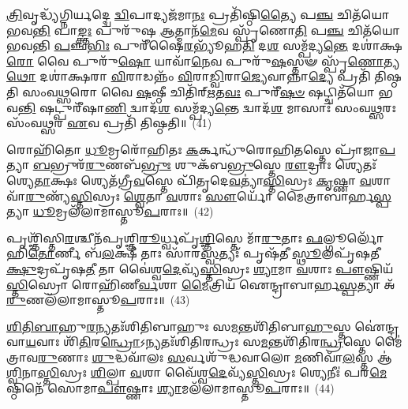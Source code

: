 \-\ul{𑌤𑍍𑌰𑌿}\-𑌵𑍃𑌦𑍍𑌧𑍍𑌯᳴𑌗𑍍𑌨𑌿𑌰𑍍𑌯𑌦𑍍𑌦𑍍𑌵𑍇 \ul{𑌦𑍍𑌵𑌿}\-𑌪𑌾𑌦𑍍𑌯𑌜᳴𑌮𑌾\-\ul{𑌨𑌃} 𑌪𑍍𑌰𑌤𑌿᳴𑌷𑍍𑌠𑌿\-\ul{𑌤𑍍𑌯𑍈} 𑌪\-\ul{𑌞𑍍𑌚} 𑌚𑌿𑌤᳴𑌯𑍋 𑌭𑌵\-\ul{𑌨𑍍𑌤𑌿} 𑌪𑌾\-\ul{𑌙𑍍𑌕𑍍𑌤𑌃} 𑌪𑍁𑌰𑍁᳴𑌷 \ul{𑌆}\-𑌤𑍍𑌮𑌾𑌨᳴\-\ul{𑌮𑍇}\-𑌵 𑌸𑍍𑌪𑍃᳴𑌣𑍋\-\ul{𑌤𑌿} 𑌪\-\ul{𑌞𑍍𑌚} 𑌚𑌿𑌤᳴𑌯𑍋 𑌭𑌵𑌨𑍍𑌤𑌿 \ul{𑌪}\-𑌞𑍍𑌚\-\ul{𑌭𑌿𑌃} 𑌪𑍁𑌰𑍀᳴𑌷𑍈\-\ul{𑌰}\-𑌭𑍍𑌯𑍂᳴𑌹\-\ul{𑌤𑌿} 𑌦\-\ul{𑌶} 𑌸𑌮𑍍𑌪᳴𑌦𑍍𑌯\-\ul{𑌨𑍍𑌤𑍇} 𑌦𑌶𑌾॑𑌕𑍍𑌷\-\ul{𑌰𑍋} 𑌵𑍈 𑌪𑍁𑌰𑍁᳴\-\ul{𑌷𑍋} 𑌯𑌾𑌵𑌾᳴\-\ul{𑌨𑍇}\-𑌵 𑌪𑍁𑌰𑍁᳴\-\ul{𑌷}\-𑌸𑍍𑌤𑍟 𑌸𑍍𑌪𑍃᳴\-\ul{𑌣𑍋}\-𑌤𑍍𑌯\-\ul{𑌥𑍋} 𑌦𑌶𑌾॑𑌕𑍍𑌷𑌰𑌾 \ul{𑌵𑌿}\-𑌰𑌾𑌡𑌨𑍍𑌨𑌂᳴ \ul{𑌵𑌿}\-𑌰𑌾\-\ul{𑌡𑍍𑌵𑌿}\-𑌰𑌾\-\ul{𑌜𑍍𑌯𑍇}\-𑌵𑌾𑌨𑍍𑌨𑌾\-\ul{𑌦𑍍𑌯𑍇} 𑌪𑍍𑌰𑌤𑌿᳴ 𑌤𑌿𑌷𑍍𑌠𑌤𑌿 𑌸𑌂𑌵\-\ul{𑌥𑍍𑌸}\-𑌰𑍋 𑌵𑍈 \ul{𑌷}\-𑌷𑍍𑌠𑍀 𑌚𑌿𑌤𑌿᳴𑌰𑍍\mbox{}\-\ul{𑌋}\-𑌤\-\ul{𑌵𑌃} 𑌪𑍁𑌰𑍀᳴\-\ul{𑌷}\-\-\ul{𑍞} 𑌷𑌟𑍍𑌚𑌿𑌤᳴𑌯𑍋 𑌭𑌵\-\ul{𑌨𑍍𑌤𑌿} 𑌷𑌟𑍍𑌪𑍁𑌰𑍀᳴𑌷𑌾\-\ul{𑌣𑌿} 𑌦𑍍𑌵𑌾𑌦᳴\-\ul{𑌶} 𑌸𑌮𑍍𑌪᳴𑌦𑍍𑌯\-\ul{𑌨𑍍𑌤𑍇} 𑌦𑍍𑌵𑌾𑌦᳴\-\ul{𑌶} 𑌮𑌾𑌸𑌾𑌃॑ 𑌸𑌂𑌵\-\ul{𑌥𑍍𑌸}\-𑌰𑌃 𑌸𑌂᳴𑌵\-\ul{𑌥𑍍𑌸}\-𑌰 \ul{𑌏}\-𑌵 𑌪𑍍𑌰𑌤𑌿᳴ 𑌤𑌿𑌷𑍍𑌠𑌤𑌿॥~(41)

{\anuvakamend[{𑌅\-\ul{𑌵} 𑌚𑌿𑌤᳴\-\ul{𑌯𑌃} 𑌪𑍁𑌰𑍀᳴\-\ul{𑌷𑌂} 𑌪𑌞𑍍𑌚᳴𑌦𑌶 𑌚}]}%

𑌰𑍋𑌹𑌿᳴𑌤𑍋 \ul{𑌧𑍂}\-𑌮𑍍𑌰𑌰𑍋᳴𑌹𑌿𑌤𑌃 \ul{𑌕}\-𑌰𑍍𑌕𑌨𑍍𑌧𑍁᳴𑌰𑍋𑌹𑌿\-\ul{𑌤}\-𑌸𑍍𑌤𑍇 𑌪𑍍𑌰𑌾᳴𑌜𑌾\-\ul{𑌪}\-𑌤𑍍𑌯𑌾 \ul{𑌬}\-𑌭𑍍𑌰𑍁𑌰᳴\-\ul{𑌰𑍁}\-𑌣𑌬᳴\-\ul{𑌭𑍍𑌰𑍁𑌃} 𑌶𑍁𑌕᳴𑌬\-\ul{𑌭𑍍𑌰𑍁}\-𑌸𑍍𑌤𑍇 \ul{𑌰𑍗}\-𑌦𑍍𑌰𑌾𑌃 𑌶𑍍𑌯𑍇𑌤𑌃᳴ 𑌶𑍍𑌯𑍇\-\ul{𑌤𑌾}\-𑌕𑍍𑌷𑌃 𑌶𑍍𑌯𑍇𑌤᳴𑌗𑍍𑌰𑍀\-\ul{𑌵}\-𑌸𑍍𑌤𑍇 𑌪𑌿᳴𑌤𑍃𑌦𑍇\-\ul{𑌵}\-𑌤𑍍𑌯𑌾॑\-\ul{𑌸𑍍𑌤𑌿}\-𑌸𑍍𑌰𑌃 \ul{𑌕𑍃}\-𑌷𑍍𑌣𑌾 \ul{𑌵}\-𑌶𑌾 𑌵𑌾᳴\-\ul{𑌰𑍁}\-𑌣𑍍𑌯᳴\-\ul{𑌸𑍍𑌤𑌿}\-𑌸𑍍𑌰𑌃 \ul{𑌶𑍍𑌵𑍇}\-𑌤𑌾 \ul{𑌵}\-𑌶𑌾𑌃 \ul{𑌸𑍗}\-𑌰𑍍𑌯𑍋᳴ 𑌮𑍈𑌤𑍍𑌰𑌾𑌬𑌾𑌰𑍍\mbox{}𑌹\-\ul{𑌸𑍍𑌪}\-𑌤𑍍𑌯𑌾 \ul{𑌧𑍂}\-𑌮𑍍𑌰𑌲᳴𑌲𑌾𑌮𑌾𑌸𑍍𑌤𑍂\-\ul{𑌪}\-𑌰𑌾𑌃॥~(42)

{\anuvakamend[{}]}%

𑌪𑍃𑌶𑍍𑌞𑌿᳴𑌸𑍍𑌤𑌿\-\ul{𑌰}\-𑌶𑍍𑌚𑍀𑌨᳴𑌪𑍃𑌶𑍍𑌞𑌿\-\ul{𑌰𑍂}\-𑌰𑍍𑌧𑍍𑌵𑌪𑍃᳴\-\ul{𑌶𑍍𑌞𑌿}\-𑌸𑍍𑌤𑍇 𑌮𑌾᳴\-\ul{𑌰𑍁}\-𑌤𑌾𑌃 \ul{𑌫}\-𑌲𑍍𑌗𑍂𑌰𑍍𑌲𑍋᳴𑌹𑌿\-\ul{𑌤𑍋}\-𑌰𑍍𑌣𑍀 𑌬᳴\-\ul{𑌲}\-𑌕𑍍𑌷𑍀 𑌤𑌾𑌃 𑌸𑌾᳴𑌰\-\ul{𑌸𑍍𑌵}\-𑌤𑍍𑌯𑌃᳴ 𑌪𑍃𑌷᳴𑌤𑍀 \ul{𑌸𑍍𑌥𑍂}\-𑌲𑌪𑍃᳴𑌷𑌤𑍀 \ul{𑌕𑍍𑌷𑍁}\-𑌦𑍍𑌰𑌪𑍃᳴𑌷\-\ul{𑌤𑍀} 𑌤𑌾 𑌵𑍈॑𑌶𑍍𑌵\-\ul{𑌦𑍇}\-𑌵𑍍𑌯᳴\-\ul{𑌸𑍍𑌤𑌿}\-𑌸𑍍𑌰𑌃 \ul{𑌶𑍍𑌯𑌾}\-𑌮𑌾 \ul{𑌵}\-𑌶𑌾𑌃 \ul{𑌪𑍗}\-𑌷𑍍𑌣𑌿𑌯᳴\-\ul{𑌸𑍍𑌤𑌿}\-𑌸𑍍𑌰𑍋 𑌰𑍋𑌹𑌿᳴𑌣𑍀\-\ul{𑌰𑍍𑌵}\-𑌶𑌾 \ul{𑌮𑍈}\-𑌤𑍍𑌰𑌿𑌯᳴ 𑌐𑌨𑍍𑌦𑍍𑌰𑌾𑌬𑌾𑌰𑍍\mbox{}𑌹\-\ul{𑌸𑍍𑌪}\-𑌤𑍍𑌯𑌾 𑌅᳴\-\ul{𑌰𑍁}\-𑌣𑌲᳴𑌲𑌾𑌮𑌾𑌸𑍍𑌤𑍂\-\ul{𑌪}\-𑌰𑌾𑌃॥~(43)

{\anuvakamend[{𑌰𑍋𑌹𑌿᳴\-\ul{𑌤𑌃} 𑌪𑍃\-\ul{𑌶𑍍𑌞𑌿𑌃} 𑌷𑌡𑍍𑌵𑌿𑍞᳴𑌶\-\ul{𑌤𑌿𑌃} 𑌷𑌡𑍍𑌵𑌿𑍞᳴𑌶𑌤𑌿𑌃}]}%

\-\ul{𑌶𑌿}\-\-\ul{𑌤𑌿}\-\-\ul{𑌬𑌾}\-𑌹𑍁\-\ul{𑌰}\-𑌨𑍍𑌯𑌤𑌃᳴𑌶𑌿𑌤𑌿𑌬𑌾𑌹𑍁𑌃 𑌸\-\ul{𑌮}\-𑌨𑍍𑌤𑌶𑌿᳴𑌤𑌿𑌬𑌾\-\ul{𑌹𑍁}\-𑌸𑍍𑌤 𑌐॑𑌨𑍍𑌦𑍍𑌰𑌵𑌾\-\ul{𑌯}\-𑌵𑌾𑌃 𑌶𑌿᳴\-\ul{𑌤𑌿}\-𑌰\-\ul{𑌨𑍍𑌧𑍍𑌰𑍋}\-\-𑌽𑌨𑍍𑌯𑌤𑌃᳴𑌶𑌿𑌤𑌿𑌰𑌨𑍍𑌧𑍍𑌰𑌃 𑌸\-\ul{𑌮}\-𑌨𑍍𑌤𑌶𑌿᳴𑌤𑌿𑌰\-\ul{𑌨𑍍𑌧𑍍𑌰}\-𑌸𑍍𑌤𑍇 𑌮𑍈॑𑌤𑍍𑌰𑌾𑌵\-\ul{𑌰𑍁}\-𑌣𑌾𑌃 \ul{𑌶𑍁}\-𑌦𑍍𑌧𑌵𑌾᳴𑌲𑌃 \ul{𑌸}\-𑌰𑍍𑌵𑌶𑍁᳴𑌦𑍍𑌧𑌵𑌾𑌲𑍋 \ul{𑌮}\-𑌣𑌿𑌵𑌾᳴\-\ul{𑌲}\-𑌸𑍍𑌤 𑌆॑\-\ul{𑌶𑍍𑌵𑌿}\-𑌨𑌾\-\ul{𑌸𑍍𑌤𑌿}\-𑌸𑍍𑌰𑌃 \ul{𑌶𑌿}\-𑌲𑍍𑌪𑌾 \ul{𑌵}\-𑌶𑌾 𑌵𑍈᳴𑌶𑍍𑌵\-\ul{𑌦𑍇}\-𑌵𑍍𑌯᳴\-\ul{𑌸𑍍𑌤𑌿}\-𑌸𑍍𑌰𑌃 𑌶𑍍𑌯𑍇𑌨𑍀𑌃॑ 𑌪𑌰\-\ul{𑌮𑍇}\-𑌷𑍍𑌠𑌿𑌨𑍇᳴ 𑌸𑍋𑌮𑌾\-\ul{𑌪𑍗}\-𑌷𑍍𑌣𑌾𑌃 \ul{𑌶𑍍𑌯𑌾}\-𑌮𑌲᳴𑌲𑌾𑌮𑌾𑌸𑍍𑌤𑍂\-\ul{𑌪}\-𑌰𑌾𑌃॥~(44)

